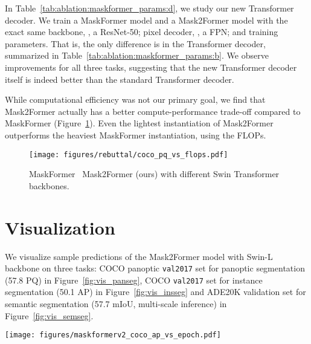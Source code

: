 \documentclass[10pt,twocolumn,letterpaper]{article}
\newcommand{\modelname}{Mask2Former\xspace}
\newcommand{\figref}[1]{Figure~\ref{#1}}
\newcommand{\tabref}[1]{Table~\ref{#1}}
\begin{document}
In \tabref{tab:ablation:maskformer_params:d}, we study our new Transformer decoder. We train a MaskFormer model and a \modelname model with the exact same backbone, \ie, a ResNet-50; pixel decoder, \ie, a FPN; and training parameters. That is, the only difference is in the Transformer decoder, summarized in \tabref{tab:ablation:maskformer_params:b}. We observe improvements for all three tasks, suggesting that the new Transformer decoder itself is indeed better than the standard Transformer decoder.

While computational efficiency was not our primary goal, we find that Mask2Former actually has a better compute-performance trade-off compared to MaskFormer (\figref{fig:pq_vs_flops}). Even the lightest instantiation of Mask2Former outperforms the heaviest MaskFormer instantiation, using   the FLOPs.

\begin{figure}[t!]
    \centering
        \texttt{[image: figures/rebuttal/coco\_pq\_vs\_flops.pdf]}
    \caption{MaskFormer~\cite{cheng2021maskformer} \vs Mask2Former (ours) with different Swin Transformer backbones.}
    \label{fig:pq_vs_flops}
\end{figure}


\section{Visualization}
\label{app:vis}
We visualize sample predictions of the \modelname model with Swin-L~\cite{liu2021swin} backbone on three tasks: COCO panoptic \texttt{val2017} set for panoptic segmentation (57.8 PQ) in \figref{fig:vis_panseg}, COCO \texttt{val2017} set for instance segmentation (50.1 AP) in \figref{fig:vis_insseg} and ADE20K validation set for semantic segmentation (57.7 mIoU, multi-scale inference) in \figref{fig:vis_semseg}.



\begin{figure*}[h!]
    \centering
    \texttt{[image: figures/maskformerv2\_coco\_ap\_vs\_epoch.pdf]}
    \caption{\textbf{Convergence analysis.} We train \modelname with different epochs using either standard scale augmentation (Standard Aug.)~\cite{wu2019detectron2} or the more recent large-scale jittering augmentation (LSJ Aug.)~\cite{ghiasi2021simple,du2021simple}. \modelname converges in 25 epochs using standard augmentation and almost converges in 50 epochs using large-scale jittering augmentation. Using LSJ also improves performance with  longer training epochs (\ie, with more than 25 epochs).}
    \label{fig:ablation:convergence}
\end{figure*}
\end{document}
